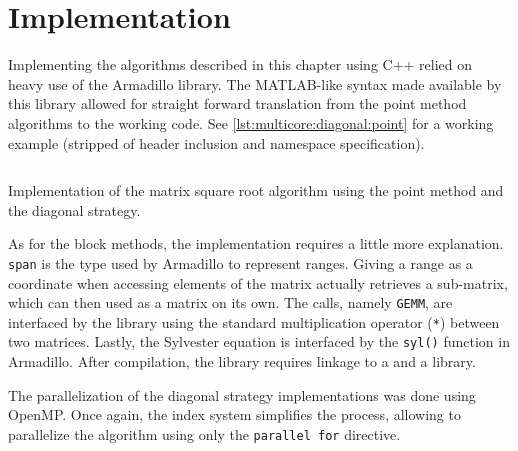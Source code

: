 \documentclass[../thesis]{subfiles}
\begin{document}
	\section{Implementation}

	Implementing the algorithms described in this chapter using C++ relied on heavy use of the Armadillo library. The MATLAB-like syntax made available by this library allowed for straight forward translation from the point method algorithms to the working code. See \cref{lst:multicore:diagonal:point} for a working example (stripped of header inclusion and namespace specification).

	\begin{listing}[htp]
		\inputminted[linenos,tabsize=4]{c++}{assets/code/multicore.diagonal.point.cpp}
		\caption[(Multicore) Point Diagonal Implementation]{Implementation of the matrix square root algorithm using the point method and the diagonal strategy.}
		\label{lst:multicore:diagonal:point}
	\end{listing}

	As for the block methods, the implementation requires a little more explanation. \texttt{span} is the type used by Armadillo to represent ranges. Giving a range as a coordinate when accessing elements of the matrix actually retrieves a sub-matrix, which can then used as a matrix on its own. The \blas calls, namely \texttt{GEMM}, are interfaced by the library using the standard multiplication operator (\texttt{*}) between two matrices. Lastly, the Sylvester equation is interfaced by the \texttt{syl()} function in Armadillo. After compilation, the library requires linkage to a \blas and a \lapack library.

	The parallelization of the diagonal strategy implementations was done using OpenMP. Once again, the index system simplifies the process, allowing to parallelize the algorithm using only the \texttt{parallel for} directive.
\end{document}
